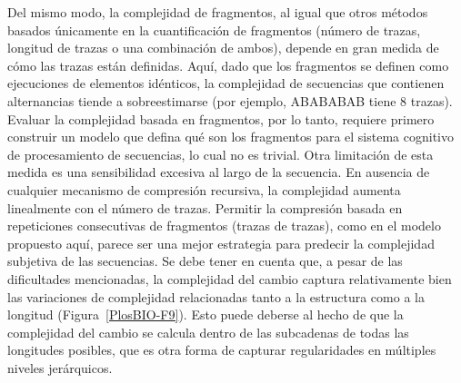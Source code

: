 
Del mismo modo, la complejidad de fragmentos, al igual que otros métodos basados únicamente en la cuantificación de fragmentos (número de trazas, longitud de trazas o una combinación de ambos), depende en gran medida de cómo las trazas están definidas. Aquí, dado que los fragmentos se definen como ejecuciones de elementos idénticos, la complejidad de secuencias que contienen alternancias tiende a sobreestimarse (por ejemplo, ABABABAB tiene 8 trazas). Evaluar la complejidad basada en fragmentos, por lo tanto, requiere primero construir un modelo que defina qué son los fragmentos para el sistema cognitivo de procesamiento de secuencias, lo cual no es trivial. Otra limitación de esta medida es una sensibilidad excesiva al largo de la secuencia. En ausencia de cualquier mecanismo de compresión recursiva, la complejidad aumenta linealmente con el número de trazas. Permitir la compresión basada en repeticiones consecutivas de fragmentos (trazas de trazas), como en el modelo \lot propuesto aquí, parece ser una mejor estrategia para predecir la complejidad subjetiva de las secuencias. Se debe tener en cuenta que, a pesar de las dificultades mencionadas, la complejidad del cambio captura relativamente bien las variaciones de complejidad relacionadas tanto a la estructura como a la longitud (Figura~\ref{PlosBIO-F9}). Esto puede deberse al hecho de que la complejidad del cambio se calcula dentro de las subcadenas de todas las longitudes posibles, que es otra forma de capturar regularidades en múltiples niveles jerárquicos.

